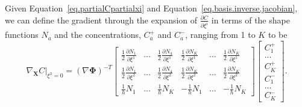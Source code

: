 \documentclass[10pt]{elsarticle}
\newcommand{\mbs}[1]{\boldsymbol{#1}}
\def\bs{{\mbs{s}}} \def\bt{{\mbs{t}}} \def\bu{{\mbs{u}}}
\def\bPhi{{\mbs{\Phi}}}
\def\bs{\boldsymbol}
\begin{document}
Given Equation~\ref{eq.partialCpartialxi} and Equation~\ref{eq.basis.inverse.jacobian}, we can define the gradient through the expansion of $\frac{\partial C}{\partial \xi^{i}}$ in terms of the shape functions $N_{a}$ and the concentrations, $C_{a}^{+}$ and $C_{a}^{-}$, ranging from 1 to $K$ to be
\begin{equation}
\label{eq.fe.grad.expand} \nabla_{\bs{X}} C\big|_{\xi^{3} = 0} = (\nabla \bPhi)^{-T} 
\begin{bmatrix} \frac{1}{2}\frac{\partial N_{1}}{\partial \xi^{1}} &  ...  &  \frac{1}{2}\frac{\partial N_{4}}{\partial \xi^{1}} & \frac{1}{2}\frac{\partial N_{K}}{\partial \xi^{1}}  & ... & \frac{1}{2}\frac{\partial N_{K}}{\partial \xi^{1}} \\
 \frac{1}{2}\frac{\partial N_{1}}{\partial \xi^{2}} &  ...  &  \frac{1}{2}\frac{\partial N_{4}}{\partial \xi^{2}}  & \frac{1}{2}\frac{\partial N_{K}}{\partial \xi^{2}}  & ... & \frac{1}{2}\frac{\partial N_{K}}{\partial \xi^{2}} \\
  \frac{1}{h} N_{1} &  ...  &   \frac{1}{h} N_{K}  &  -\frac{1}{h} N_{1} & ... &  -\frac{1}{h} N_{K} \end{bmatrix}
  \begin{bmatrix} C_{1}^{+} \\ ... \\ C_{K}^{+} \\ C_{1}^{-} \\ ... \\ C_{K}^{-}  \end{bmatrix}.
\end{equation}
\end{document}
